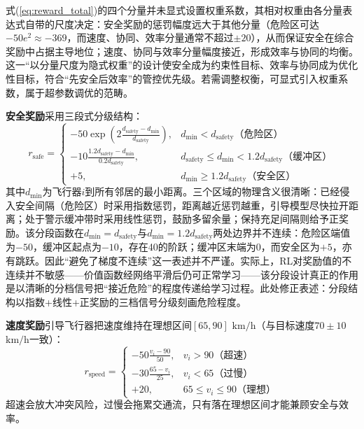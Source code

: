 \documentclass[12pt,a4paper,UTF8]{ctexart}
\begin{document}
式(\ref{eq:reward_total})的四个分量并未显式设置权重系数，其相对权重由各分量表达式自带的尺度决定：安全奖励的惩罚幅度远大于其他分量（危险区可达$-50e^{2}\approx-369$，而速度、协同、效率分量通常不超过$\pm20$），从而保证安全在综合奖励中占据主导地位；速度、协同与效率分量幅度接近，形成效率与协同的均衡。这一“以分量尺度为隐式权重”的设计使安全成为约束性目标、效率与协同成为优化性目标，符合“先安全后效率”的管控优先级。若需调整权衡，可显式引入权重系数，属于超参数调优的范畴。

\textbf{安全奖励}采用三段式分级结构：
\begin{equation}
    r_{\text{safe}} = \begin{cases}
        -50 \exp\!\left(2\frac{d_{\text{safety}}-d_{\min}}{d_{\text{safety}}}\right), & d_{\min}<d_{\text{safety}} \text{（危险区）}\\
        -10 \frac{1.2d_{\text{safety}}-d_{\min}}{0.2d_{\text{safety}}}, & d_{\text{safety}}\leq d_{\min}<1.2d_{\text{safety}} \text{（缓冲区）}\\
        +5, & d_{\min}\geq1.2d_{\text{safety}} \text{（安全区）}
    \end{cases}
    \label{eq:reward_safe}
\end{equation}
其中$d_{\min}$为飞行器$i$到所有邻居的最小距离。三个区域的物理含义很清晰：已经侵入安全间隔（危险区）时采用指数惩罚，距离越近惩罚越重，引导模型尽快拉开距离；处于警示缓冲带时采用线性惩罚，鼓励多留余量；保持充足间隔则给予正奖励。该分段函数在$d_{\min}=d_{\text{safety}}$与$d_{\min}=1.2d_{\text{safety}}$两处边界并不连续：危险区端值为$-50$，缓冲区起点为$-10$，存在40的阶跃；缓冲区末端为0，而安全区为$+5$，亦有跳跃。因此“避免了梯度不连续”这一表述并不严谨。实际上，RL对奖励值的不连续并不敏感——价值函数经网络平滑后仍可正常学习——该分段设计真正的作用是以清晰的分档信号把“接近危险”的程度传递给学习过程。此处修正表述：分段结构以指数+线性+正奖励的三档信号分级刻画危险程度。

\textbf{速度奖励}引导飞行器把速度维持在理想区间$[65,90]$ $\mathrm{km/h}$（与目标速度$70\pm10$ $\mathrm{km/h}$一致）：
\begin{equation}
    r_{\text{speed}} = \begin{cases}
        -50\frac{v_i-90}{50}, & v_i>90 \text{（超速）}\\
        -30\frac{65-v_i}{25}, & v_i<65 \text{（过慢）}\\
        +20, & 65\leq v_i\leq 90 \text{（理想）}
    \end{cases}
    \label{eq:reward_speed}
\end{equation}
超速会放大冲突风险，过慢会拖累交通流，只有落在理想区间才能兼顾安全与效率。
\end{document}
